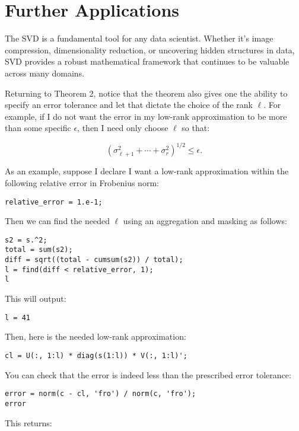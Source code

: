 \documentclass{ximera}
\begin{document}
\section{Further Applications}

The SVD is a fundamental tool for any data scientist. Whether it’s image compression, dimensionality reduction, or uncovering hidden structures in data, SVD provides a robust mathematical framework that continues to be valuable across many domains.

Returning to Theorem 2, notice that the theorem also gives one the ability to specify an error tolerance and let that dictate the choice of the rank \( \ell \). For example, if I do not want the error in my low-rank approximation to be more than some specific \( \epsilon \), then I need only choose \( \ell \) so that:

\[
\left( \sigma_{\ell+1}^2 + \cdots + \sigma_{r}^2 \right)^{1/2} \leq \epsilon.
\]

As an example, suppose I declare I want a low-rank approximation within the following relative error in Frobenius norm:

\begin{verbatim}
relative_error = 1.e-1;
\end{verbatim}

Then we can find the needed \( \ell \) using an aggregation and masking as follows:

\begin{verbatim}
s2 = s.^2;
total = sum(s2);
diff = sqrt((total - cumsum(s2)) / total);
l = find(diff < relative_error, 1);
l
\end{verbatim}

This will output:

\begin{verbatim}
l = 41
\end{verbatim}

Then, here is the needed low-rank approximation:

\begin{verbatim}
cl = U(:, 1:l) * diag(s(1:l)) * V(:, 1:l)';
\end{verbatim}

You can check that the error is indeed less than the prescribed error tolerance:

\begin{verbatim}
error = norm(c - cl, 'fro') / norm(c, 'fro');
error
\end{verbatim}

This returns:
\end{document}
